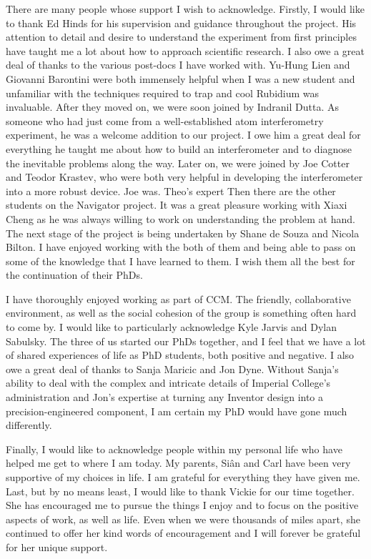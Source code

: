 \begin{acknowledgements}
\noindent
There are many people whose support I wish to acknowledge. Firstly, I would like to thank Ed Hinds for his
supervision and guidance throughout the project. His attention to
detail and desire to understand the experiment from first principles
have taught me a lot about how to approach scientific research. I also
owe a great deal of thanks to the various post-docs I have worked
with. Yu-Hung Lien and Giovanni Barontini were both immensely helpful when I was a new student
and unfamiliar with the techniques required to trap and cool Rubidium
was invaluable. After they moved on, we were soon joined by Indranil
Dutta. As someone who had just come from a well-established
atom interferometry experiment, he was a welcome addition
to our project. I owe him a great deal for everything he taught me
about how to build an interferometer and to diagnose the inevitable
problems along the way. Later on, we were joined by Joe Cotter and
Teodor Krastev, who were both very helpful in developing the
interferometer into a more robust device. Joe was. Theo's expert
Then there are the other students on the Navigator project. It was a
great pleasure working with Xiaxi Cheng as he was always willing to
work on understanding the problem at hand. The next stage of the
project is being undertaken by Shane de Souza and Nicola Bilton. I
have enjoyed working with the both of them and being able to pass on
some of the knowledge that I have learned to them. I wish them all the
best for the continuation of their PhDs. 
\par\noindent 
I have thoroughly enjoyed working as part of CCM. The friendly,
collaborative environment, as well as the social cohesion of the group
is something often hard to come by. I would like to particularly
acknowledge Kyle Jarvis and Dylan Sabulsky. The three of us started
our PhDs together, and I feel that we have a lot of shared experiences
of life as PhD students, both positive and negative. I also owe a
great deal of thanks to Sanja Maricic and Jon Dyne. Without Sanja's
ability to deal with the complex and intricate details of Imperial
College's administration and Jon's expertise at turning
any Inventor design into a precision-engineered component, I am
certain my PhD would have gone much differently.
\par\noindent
Finally, I would like to acknowledge people within my personal life
who have helped me get to where I am today. My parents, Si\^{a}n and
Carl have been very supportive of my choices in life. I am grateful
for everything they have given me. Last, but by no means least, I would
like to thank Vickie for our time together. She has encouraged me to pursue the things I
enjoy and to focus on the positive aspects of work, as well as life. Even when we were thousands of miles apart, she continued to
offer her kind words of encouragement and I will forever be grateful
for her unique support.
\end{acknowledgements}


\tableofcontents
\listoffigures
\listoftables
{}

